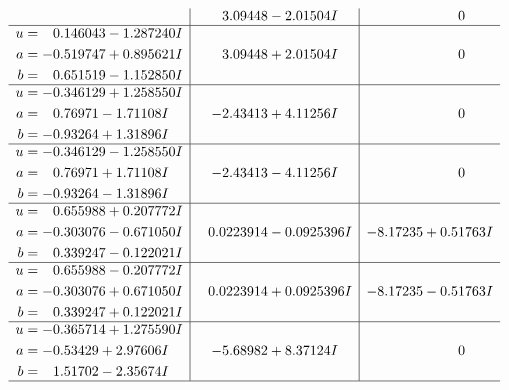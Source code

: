 \documentclass[1p]{elsarticle_modified}
\theoremstyle{definition}
\begin{document}
$$\begin{array}{c|c|c}
 & \phantom{-}3.09448 - 2.01504 I & \phantom{-0.000000 } 0 \\ \hline\begin{aligned}
u &= \phantom{-}0.146043 - 1.287240 I \\
a &= -0.519747 + 0.895621 I \\
b &= \phantom{-}0.651519 - 1.152850 I\end{aligned}
 & \phantom{-}3.09448 + 2.01504 I & \phantom{-0.000000 } 0 \\ \hline\begin{aligned}
u &= -0.346129 + 1.258550 I \\
a &= \phantom{-}0.76971 - 1.71108 I \\
b &= -0.93264 + 1.31896 I\end{aligned}
 & -2.43413 + 4.11256 I & \phantom{-0.000000 } 0 \\ \hline\begin{aligned}
u &= -0.346129 - 1.258550 I \\
a &= \phantom{-}0.76971 + 1.71108 I \\
b &= -0.93264 - 1.31896 I\end{aligned}
 & -2.43413 - 4.11256 I & \phantom{-0.000000 } 0 \\ \hline\begin{aligned}
u &= \phantom{-}0.655988 + 0.207772 I \\
a &= -0.303076 - 0.671050 I \\
b &= \phantom{-}0.339247 - 0.122021 I\end{aligned}
 & \phantom{-}0.0223914 - 0.0925396 I & -8.17235 + 0.51763 I \\ \hline\begin{aligned}
u &= \phantom{-}0.655988 - 0.207772 I \\
a &= -0.303076 + 0.671050 I \\
b &= \phantom{-}0.339247 + 0.122021 I\end{aligned}
 & \phantom{-}0.0223914 + 0.0925396 I & -8.17235 - 0.51763 I \\ \hline\begin{aligned}
u &= -0.365714 + 1.275590 I \\
a &= -0.53429 + 2.97606 I \\
b &= \phantom{-}1.51702 - 2.35674 I\end{aligned}
 & -5.68982 + 8.37124 I & \phantom{-0.000000 } 0\\
 \hline 
 \end{array}$$\newpage$$\begin{array}{c|c|c}  

\end{array}$$
\end{document}
